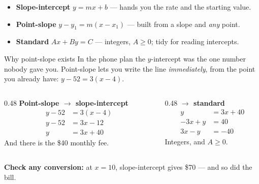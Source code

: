 \documentclass[aspectratio=169, 11pt]{beamer}
\begin{document}
\begin{frame}[t, plain]
  \begin{itemize}\setlength{\itemsep}{5pt}
    \item \textbf{Slope-intercept} $y=mx+b$ --- hands you the rate and the starting value.
    \item \textbf{Point-slope} $y-y_1=m(x-x_1)$ --- built from a slope and \emph{any} point.
    \item \textbf{Standard} $Ax+By=C$ --- integers, $A\ge0$; tidy for reading intercepts.
  \end{itemize}
  \vspace{5pt}
  \begin{block}{Why point-slope exists}
    In the phone plan the $y$-intercept was the one number nobody gave you. Point-slope lets you
    write the line \emph{immediately}, from the point you already have:
    \; $y-52 = 3(x-4)$.
  \end{block}
\end{frame}

\begin{frame}[t, plain]
  \begin{columns}[T]
    \begin{column}{0.48\textwidth}
      \textbf{Point-slope $\to$ slope-intercept}
      \begin{align*}
        y-52 &= 3(x-4) \\
        y-52 &= 3x-12 \\
           y &= 3x+40
      \end{align*}
      And there is the \$40 monthly fee.
    \end{column}
    \begin{column}{0.48\textwidth}
      \textbf{$\to$ standard}
      \begin{align*}
             y &= 3x+40 \\
        -3x+y &= 40 \\
         3x-y &= -40
      \end{align*}
      Integers, and $A \ge 0$.
    \end{column}
  \end{columns}
  \vspace{4pt}
  \textbf{Check any conversion:} at $x=10$, slope-intercept gives \$70 --- and so did the bill.
\end{frame}
\end{document}
